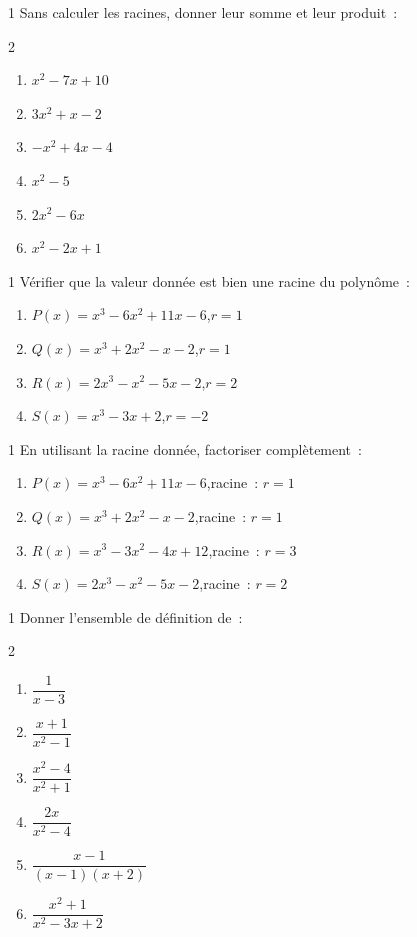 \begin{exo}{1}
Sans calculer les racines, donner leur somme et leur produit~:
\begin{multicols}{2}
\begin{enumerate}
  \item $x^2 - 7x + 10$
  \item $3x^2 + x - 2$
  \item $-x^2 + 4x - 4$
  \item $x^2 - 5$
  \item $2x^2 - 6x$
  \item $x^2 - 2x + 1$
\end{enumerate}
\end{multicols}
\end{exo}

\begin{exo}{1}
V\'erifier que la valeur donn\'ee est bien une racine du polyn\^ome~:
\begin{enumerate}
  \item $P(x) = x^3 - 6x^2 + 11x - 6$,\quad $r = 1$
  \item $Q(x) = x^3 + 2x^2 - x - 2$,\quad $r = 1$
  \item $R(x) = 2x^3 - x^2 - 5x - 2$,\quad $r = 2$
  \item $S(x) = x^3 - 3x + 2$,\quad $r = -2$
\end{enumerate}
\end{exo}

\begin{exo}{1}
En utilisant la racine donn\'ee, factoriser compl\`etement~:
\begin{enumerate}
  \item $P(x) = x^3 - 6x^2 + 11x - 6$,\quad racine~: $r=1$
  \item $Q(x) = x^3 + 2x^2 - x - 2$,\quad racine~: $r=1$
  \item $R(x) = x^3 - 3x^2 - 4x + 12$,\quad racine~: $r=3$
  \item $S(x) = 2x^3 - x^2 - 5x - 2$,\quad racine~: $r=2$
\end{enumerate}
\end{exo}

\begin{exo}{1}
Donner l'ensemble de d\'efinition de~:
\begin{multicols}{2}
\begin{enumerate}
  \item $\dfrac{1}{x-3}$
  \item $\dfrac{x+1}{x^2-1}$
  \item $\dfrac{x^2-4}{x^2+1}$
  \item $\dfrac{2x}{x^2-4}$
  \item $\dfrac{x-1}{(x-1)(x+2)}$
  \item $\dfrac{x^2+1}{x^2-3x+2}$
\end{enumerate}
\end{multicols}
\end{exo}

